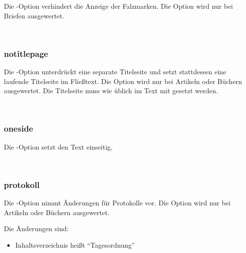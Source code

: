Die -Option verhindert die Anzeige der Falzmarken.
Die Option wird nur bei Briefen ausgewertet.

\begin{nutzung}
		\>\\
\end{nutzung}

\subsubsection{notitlepage}

Die -Option unterdrückt eine separate Titelseite und setzt stattdessen eine laufende Titelseite im Fließtext.
Die Option wird nur bei Artikeln oder Büchern ausgewertet.
Die Titelseite muss wie üblich im Text mit  gesetzt werden.

\begin{nutzung}
		\>\\
\end{nutzung}

\subsubsection{oneside}

Die -Option setzt den Text einseitig,

\begin{nutzung}
		\>\\
\end{nutzung}

\subsubsection{protokoll}

Die -Option nimmt Änderungen für Protokolle vor.
Die Option wird nur bei Artikeln oder Büchern ausgewertet.

Die Änderungen sind:
\begin{itemize}
	\item Inhaltsverzeichnis heißt "`Tagesordnung"'
\end{itemize}

\begin{nutzung}
		\>\\
\end{nutzung}



